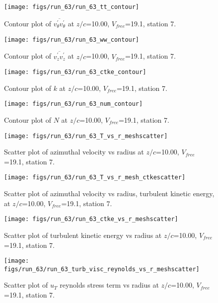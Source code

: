 \begin{figure}[H]
\centering
\texttt{[image: figs/run\_63/run\_63\_tt\_contour]}
\caption{Contour plot of $\overline{v_{\theta}^{\prime} v_{\theta}^{\prime}}$ at $z/c$=10.00, $V_{free}$=19.1, station 7.}
\end{figure}


\begin{figure}[H]
\centering
\texttt{[image: figs/run\_63/run\_63\_ww\_contour]}
\caption{Contour plot of $\overline{v_{z}^{\prime} v_{z}^{\prime}}$ at $z/c$=10.00, $V_{free}$=19.1, station 7.}
\end{figure}


\begin{figure}[H]
\centering
\texttt{[image: figs/run\_63/run\_63\_ctke\_contour]}
\caption{Contour plot of $k$ at $z/c$=10.00, $V_{free}$=19.1, station 7.}
\end{figure}


\begin{figure}[H]
\centering
\texttt{[image: figs/run\_63/run\_63\_num\_contour]}
\caption{Contour plot of $N$ at $z/c$=10.00, $V_{free}$=19.1, station 7.}
\end{figure}


\begin{figure}[H]
\centering
\texttt{[image: figs/run\_63/run\_63\_T\_vs\_r\_meshscatter]}
\caption{Scatter plot of azimuthal velocity vs radius at $z/c$=10.00, $V_{free}$=19.1, station 7.}
\end{figure}


\begin{figure}[H]
\centering
\texttt{[image: figs/run\_63/run\_63\_T\_vs\_r\_mesh\_ctkescatter]}
\caption{Scatter plot of azimuthal velocity vs radius, turbulent kinetic energy, at $z/c$=10.00, $V_{free}$=19.1, station 7.}
\end{figure}


\begin{figure}[H]
\centering
\texttt{[image: figs/run\_63/run\_63\_ctke\_vs\_r\_meshscatter]}
\caption{Scatter plot of turbulent kinetic energy vs radius at $z/c$=10.00, $V_{free}$=19.1, station 7.}
\end{figure}


\begin{figure}[H]
\centering
\texttt{[image: figs/run\_63/run\_63\_turb\_visc\_reynolds\_vs\_r\_meshscatter]}
\caption{Scatter plot of $
u_T$ reynolds stress term vs radius at $z/c$=10.00, $V_{free}$=19.1, station 7.}
\end{figure}


